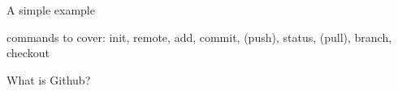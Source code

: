 \documentclass[12pt]{beamer}
\begin{document}
\begin{frame}

	\begin{flushright}
	\Large \textcolor{boss2}{A simple example} 
	\end{flushright}

commands to cover: init, remote, add, commit, (push), status, (pull), branch, checkout

\end{frame}










































\begin{frame}

	\begin{flushright}
	\Large \textcolor{boss2}{What is Github?} 
	\end{flushright}

\end{frame}
\end{document}
